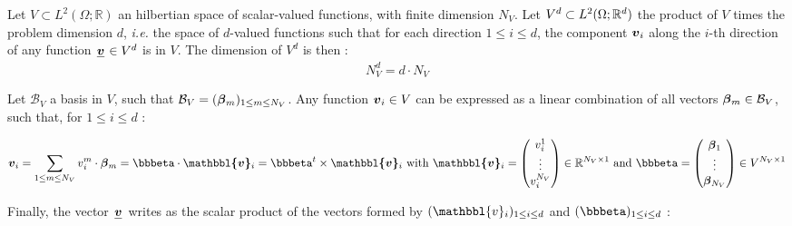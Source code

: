 \documentclass[fleqn]{article}
\begin{document}
        Let $V \subset L^2(\Omega;\mathbb{R})$ an hilbertian space of scalar-valued functions, with finite dimension $N_V$. Let $V^d \subset L^2(\Omega;\mathbb{R}^d)$ the product of $V$ times the problem dimension $d$, \textit{i.e.} the space of $d$-valued functions such that for each direction $1 \leq i \leq d$, the component $\bm{v}{}_{i}$  along the $i$-th direction of any function $\tensori{v} \in V^d$ is in $V$. The dimension of $V^d$ is then :
        \begin{equation}
          N_V^d = d \cdot N_V
        \end{equation}
        \par
        Let $\mathcal{B}_V$ a basis in $V$, such that $\mathcal{B}_V = (\bm{\beta}{}_{m}){}_{1 \leq m \leq N_V}$.
        \newline
        Any function $\bm{v}{}_{i} \in V$ can be expressed as a linear combination of all vectors $\bm{\beta}{}_{m} \in \mathcal{B}_V$, such that, for $1 \leq i \leq d $ :

        \begin{equation*}
          {\tensoro{v}\subscript{i}} = \sum_{1 \leq m \leq N_V} {v}\subsupscript{i}{m} \cdot \tensoro{\beta}\subscript{m}
          =
          \tensoro{\bbbeta} \cdot \tensoro{\mathbbl{v}}\subscript{i}
          =
          \tensoro{\bbbeta} \supscript{t} \times \tensoro{\mathbbl{v}}\subscript{i}
          \mbox{ with }
          \tensoro{\mathbbl{v}}\subscript{i} =
          \begin{pmatrix}
            {v}\subsupscript{i}{1} \\ \vdots \\ {v}\subsupscript{i}{N_V}
          \end{pmatrix} \in \mathbb{R}^{N_V \times 1}
          \mbox{ and }
          \tensoro{\bbbeta} =
          \begin{pmatrix}
            \tensoro{\beta}\subscript{1} \\ \vdots \\ \tensoro{\beta}\subscript{N_V}
          \end{pmatrix} \in V^{N_V \times 1}
        \end{equation*}

        Finally, the vector $\tensori{v}$ writes as the scalar product of the vectors formed by $(\mathbbl{v}\subscript{i})\subscript{1 \leq i \leq d}$ and $(\bbbeta)\subscript{1 \leq i \leq d}$ :
        
\end{document}
